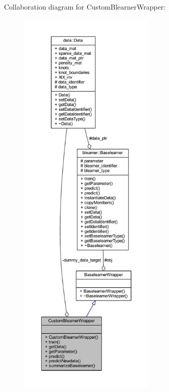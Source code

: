 Collaboration diagram for Custom\+Blearner\+Wrapper\+:
\nopagebreak
\begin{figure}[H]
\begin{center}
\leavevmode
\includegraphics[height=550pt]{class_custom_blearner_wrapper__coll__graph}
\end{center}
\end{figure}
